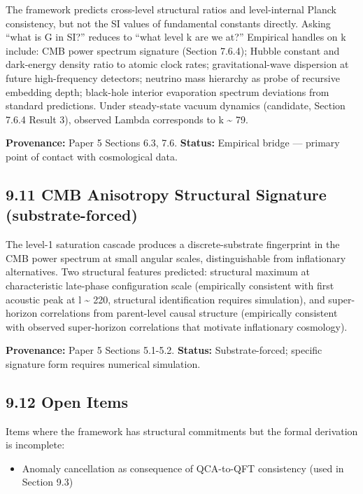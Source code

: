 \documentclass[11pt,oneside]{report}
\theoremstyle{definition}
\theoremstyle{remark}
\providecommand{\tightlist}{\setlength{\itemsep}{0pt}\setlength{\parskip}{0pt}}
\begin{document}
The framework predicts cross-level structural ratios and level-internal
Planck consistency, but not the SI values of fundamental constants
directly. Asking ``what is G in SI?'' reduces to ``what level k are we
at?'' Empirical handles on k include: CMB power spectrum signature
(Section 7.6.4); Hubble constant and dark-energy density ratio to atomic
clock rates; gravitational-wave dispersion at future high-frequency
detectors; neutrino mass hierarchy as probe of recursive embedding
depth; black-hole interior evaporation spectrum deviations from standard
predictions. Under steady-state vacuum dynamics (candidate, Section
7.6.4 Result 3), observed Lambda corresponds to k \textasciitilde{} 79.

\textbf{Provenance:} Paper 5 Sections 6.3, 7.6. \textbf{Status:}
Empirical bridge --- primary point of contact with cosmological data.

\subsection*{9.11 CMB Anisotropy Structural Signature (substrate-forced)}

The level-1 saturation cascade produces a discrete-substrate fingerprint
in the CMB power spectrum at small angular scales, distinguishable from
inflationary alternatives. Two structural features predicted: structural
maximum at characteristic late-phase configuration scale (empirically
consistent with first acoustic peak at l \textasciitilde{} 220,
structural identification requires simulation), and super-horizon
correlations from parent-level causal structure (empirically consistent
with observed super-horizon correlations that motivate inflationary
cosmology).

\textbf{Provenance:} Paper 5 Sections 5.1-5.2. \textbf{Status:}
Substrate-forced; specific signature form requires numerical simulation.

\subsection*{9.12 Open Items}

Items where the framework has structural commitments but the formal
derivation is incomplete:

\begin{itemize}
\tightlist
\item
  Anomaly cancellation as consequence of QCA-to-QFT consistency (used in
  Section 9.3)
\end{itemize}
\end{document}

